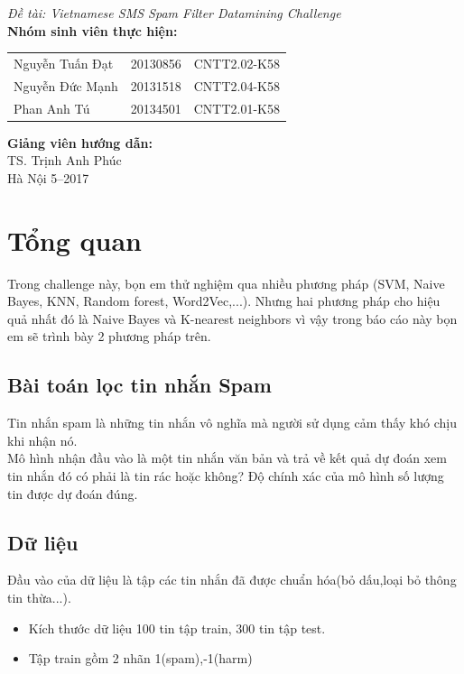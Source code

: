 \documentclass[a4paper,12pt]{report}
\renewcommand{\contentsname}{Mục lục}
\begin{document}
\begin{center}
{\fontsize{18}{20}\selectfont \emph{Đề tài:  Vietnamese SMS Spam Filter Datamining Challenge }}\\[2cm]
\hspace{-5cm}\fontsize{14}{16}\selectfont \textbf{Nhóm sinh viên thực hiện:}\\[0.1cm] 
\begin{longtable}{l c c}
Nguyễn Tuấn Đạt & 20130856 & CNTT2.02-K58 \\
Nguyễn Đức Mạnh & 20131518 & CNTT2.04-K58\\
Phan Anh Tú &   20134501 & CNTT2.01-K58\\
\end{longtable}

\hspace{-6cm}\fontsize{14}{16}\selectfont \textbf{Giảng viên hướng dẫn:}\\[0.1cm]
\hspace{-2.7cm}\fontsize{14}{16}\selectfont TS. Trịnh Anh Phúc \\[3.0cm]
\fontsize{16}{19}\selectfont Hà Nội 5--2017
\end{center}
\newpage
\pdfbookmark{\contentsname}{toc}
\tableofcontents
\listoffigures

\chapter{Tổng quan}
Trong challenge này, bọn em thử nghiệm qua nhiều phương pháp (SVM, Naive Bayes, KNN, Random forest, Word2Vec,...). Nhưng hai phương pháp cho hiệu quả nhất đó là Naive Bayes và K-nearest neighbors vì vậy trong báo cáo này bọn em sẽ trình bày 2 phương pháp trên.
\section{Bài toán lọc tin nhắn Spam}
Tin nhắn spam là những tin nhắn vô nghĩa mà người sử dụng cảm thấy khó chịu khi nhận nó. \\

Mô hình nhận đầu vào là một tin nhắn văn bản và trả về kết quả dự đoán xem tin nhắn đó có phải là tin rác hoặc không? Độ chính xác của mô hình số lượng tin được dự đoán đúng.
\section{Dữ liệu}
Đầu vào của dữ liệu là tập các tin nhắn đã được chuẩn hóa(bỏ dấu,loại bỏ thông tin thừa...). \\
\begin{itemize}
\item Kích thước dữ liệu 100 tin tập train, 300 tin tập test.
\item Tập train gồm 2 nhãn 1(spam),-1(harm)
\end{itemize}
\end{document}
